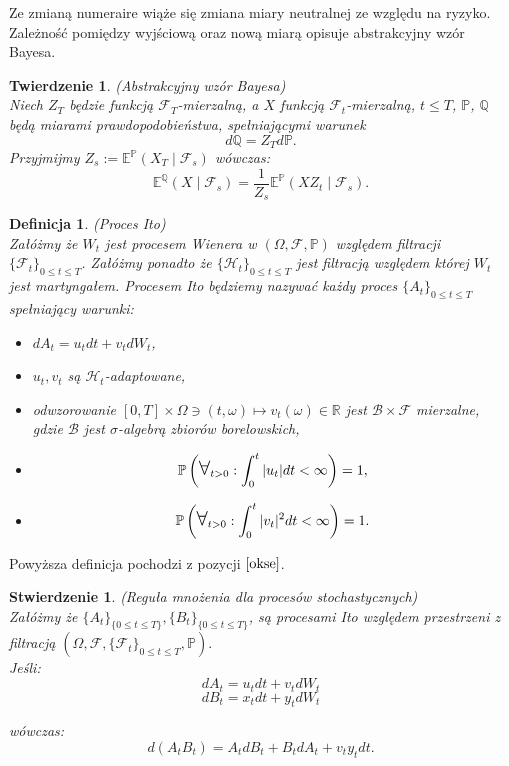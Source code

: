 \documentclass[11pt]{report}
\newtheorem{df}{Definicja}[chapter]
\newtheorem{tw}{Twierdzenie}[chapter]
\newtheorem{stw}{Stwierdzenie}[chapter]
\newcommand\bigforall{\mbox{\Large $\mathsurround0pt\forall$}}
\begin{document}
Ze zmianą numeraire wiąże się zmiana miary neutralnej ze względu na ryzyko. Zależność pomiędzy wyjściową oraz nową miarą opisuje abstrakcyjny wzór Bayesa.

\begin{tw}{(Abstrakcyjny wzór Bayesa)} \\
Niech $Z_T$ będzie funkcją $\mathscr{F}_T$-mierzalną, a $X$ funkcją $\mathscr{F}_t$-mierzalną, $t \le T$,   $\mathbb{P}$, $\mathbb{Q}$ będą miarami prawdopodobieństwa, spełniającymi warunek 
\begin{equation*}
d\mathbb{Q} = Z_T d\mathbb{P}.
\end{equation*}
Przyjmijmy  $Z_s := \mathbb{E}^{\mathbb{P}} \left( X_T \middle| \mathscr{F}_s \right)$ wówczas:
\begin{equation*}
\mathbb{E}^{\mathbb{Q}} \left(X \middle| \mathscr{F}_s \right) = \frac{1}{Z_s}\mathbb{E}^{\mathbb{P}} \left( X Z_t \middle| \mathscr{F}_s \right) .
\end{equation*} 
\end{tw}


\begin{df}(Proces Ito) $ $ \\
Załóżmy że $W_t$ jest procesem Wienera w $(\Omega,\mathscr{F},\mathbb{P})$ względem filtracji $\{\mathscr{F}_t \}_{0 \le t \le T}$. Załóżmy ponadto że $\{ \mathscr{H}_t \}_{0 \le t \le T}$ jest filtracją względem której $W_t$ jest martyngałem. Procesem Ito będziemy nazywać każdy proces $\{A_t\}_{0 \le t \le T}$ spełniający warunki:
\begin{itemize}
\item $dA_t = u_tdt + v_t dW_t$,
\item $u_t, v_t$ są $\mathscr{H}_t$-adaptowane, 
\item odwzorowanie $[0,T] \times \Omega \ni (t,\omega) \mapsto v_t(\omega) \in \mathbb{R}$ jest $\mathscr{B} \times \mathscr{F}$ mierzalne, gdzie $\mathscr{B}$ jest $\sigma$-algebrą zbiorów borelowskich,
\item $$\mathbb{P}\left(\bigforall _{t>0}: \int_{0}^{t} |u_t| dt < \infty  \right) = 1, $$
\item $$\mathbb{P}\left(\bigforall _{t>0}: \int_{0}^{t} |v_t|^2 dt < \infty  \right) = 1. $$
\end{itemize} 
\end{df}

Powyższa definicja pochodzi z pozycji $\cite{okse}$.
 

\begin{stw}{(Reguła mnożenia dla procesów stochastycznych)} \\ 
 Załóżmy że $\{A_t\}_{ \{0 \le t \le T\} }, \{B_t\}_{ \{0 \le t \le T\} }$, są procesami Ito względem przestrzeni z filtracją $(\Omega, \mathscr{F}, \{\mathscr{F}_t\}_{0 \le t \le T }, \mathbb{P}).$ \\
 Jeśli:
 $$dA_t = u_tdt + v_t dW_t$$
 $$dB_t = x_tdt + y_t dW_t$$

wówczas:
\begin{equation*}
d(A_tB_t) = A_tdB_t + B_tdA_t + v_t y_t dt. 
\end{equation*}

\end{stw}
\end{document}
